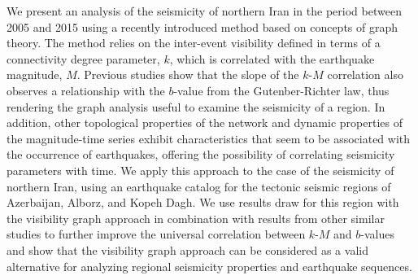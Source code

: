 %
We present an analysis of the seismicity of northern Iran in the period between 2005 and 2015 using a recently introduced method based on concepts of graph theory. The method relies on the inter-event visibility defined in terms of a connectivity degree parameter, $k$, which is correlated with the earthquake magnitude, $M$. Previous studies show that the slope of the $k$-$M$ correlation also observes a relationship with the $b$-value from the Gutenber-Richter law, thus rendering the graph analysis useful to examine the seismicity of a region. In addition, other topological properties of the network and dynamic properties of the magnitude-time series exhibit characteristics that seem to be associated with the occurrence of earthquakes, offering the possibility of correlating seismicity parameters with time. We apply this approach to the case of the seismicity of northern Iran, using an earthquake catalog for the tectonic seismic regions of Azerbaijan, Alborz, and Kopeh Dagh. We use results draw for this region with the visibility graph approach in combination with results from other similar studies to further improve the universal correlation between $k$-$M$ and $b$-values and show that the visibility graph approach can be considered as a valid alternative for analyzing regional seismicity properties and earthquake sequences.
